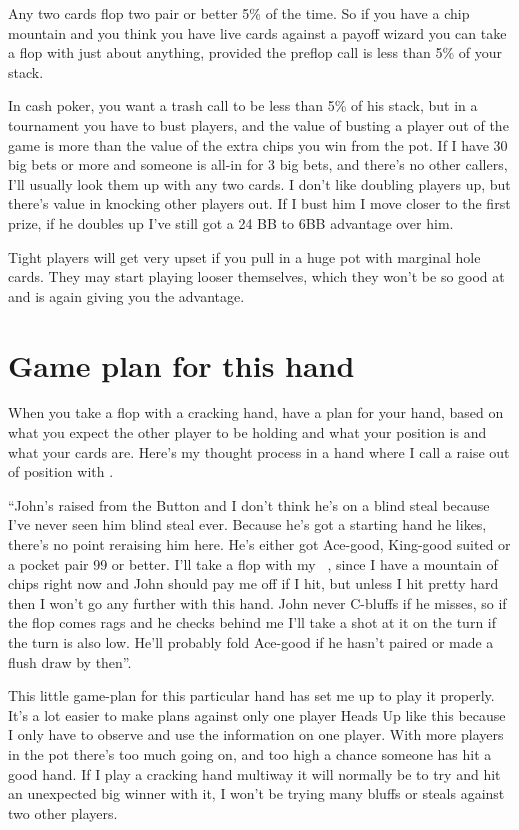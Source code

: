 Any two cards flop two pair or better 5\% of the time. So if you have
a chip mountain and you think you have live cards against a payoff
wizard you can take a flop with just about anything, provided the
preflop call is less than 5\% of your stack.

In cash poker, you want a trash call to be less than 5\% of his stack,
but in a tournament you have to bust players, and the value of
busting a player out of the game is more than the value of the
extra chips you win from the pot. If I have 30 big bets or more and
someone is all-in for 3 big bets, and there's no other callers, I'll
usually look them up with any two cards. I don't like doubling players
up, but there's value in knocking other players out. If I bust him
I move closer to the first prize, if he doubles up I've still got
a 24 BB to 6BB advantage over him.

Tight players will get very upset if you pull in a huge pot
with marginal hole cards. They may start playing looser themselves,
which they won't be so good at and is again giving you the advantage.

\section{Game plan for this hand}

When you take a flop with a cracking hand, have a plan for your hand, based
on what you expect the other player to be holding and what your
position is and what your cards are. Here's my thought process
in a hand where I call a raise out of position with \eigc\sixc.

``John's raised from the Button and I don't think he's on a blind
steal because I've never seen him blind steal ever. Because he's
got a starting hand he likes, there's no point reraising him here. He's
either got Ace-good, King-good suited or a pocket pair 99 or better.
I'll take a flop with my \eigc\sixc\ , since I have a mountain of
chips right now and John should pay me off if I hit, but unless I
hit pretty hard then I won't go any further with this hand. John
never C-bluffs if he misses, so if the flop comes rags and he checks
behind me I'll take a shot at it on the turn if the turn is also low.
He'll probably fold Ace-good if he hasn't paired or made a flush
draw by then''.

This little game-plan for this particular hand has set me
up to play it properly. It's a lot easier to make plans
against only one player Heads Up like this because I only have
to observe and use the information on one player. With more players
in the pot there's too much going on, and too high a chance someone
has hit a good hand. If I play a cracking hand multiway it will
normally be to try and hit an unexpected big winner with it, I won't
be trying many bluffs or steals against two other players.


